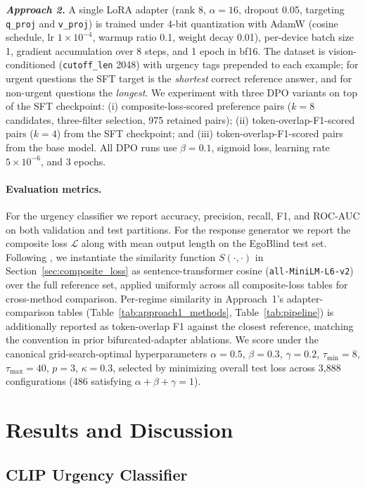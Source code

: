 \documentclass{article}
\begin{document}
\textit{\textbf{Approach 2.}}
A single LoRA adapter (rank 8, $\alpha = 16$, dropout 0.05, targeting \texttt{q\_proj} and \texttt{v\_proj}) is trained under 4-bit quantization with AdamW (cosine schedule, lr $1\!\times\!10^{-4}$, warmup ratio 0.1, weight decay 0.01), per-device batch size 1, gradient accumulation over 8 steps, and 1 epoch in bf16. The dataset is vision-conditioned (\texttt{cutoff\_len} 2048) with urgency tags prepended to each example; for urgent questions the SFT target is the \emph{shortest} correct reference answer, and for non-urgent questions the \emph{longest}. We experiment with three DPO variants on top of the SFT checkpoint: (i) composite-loss-scored preference pairs ($k = 8$ candidates, three-filter selection, 975 retained pairs); (ii) token-overlap-F1-scored pairs ($k = 4$) from the SFT checkpoint; and (iii) token-overlap-F1-scored pairs from the base model. All DPO runs use $\beta = 0.1$, sigmoid loss, learning rate $5 \times 10^{-6}$, and 3 epochs.

\paragraph{Evaluation metrics.}
For the urgency classifier we report accuracy, precision, recall, F1, and ROC-AUC on both validation and test partitions. For the response generator we report the composite loss $\mathcal{L}$ along with mean output length on the EgoBlind test set. Following \cite{xiao2025egoblind}, we instantiate the similarity function $S(\cdot,\cdot)$ in Section~\ref{sec:composite_loss} as sentence-transformer cosine (\texttt{all-MiniLM-L6-v2}) over the full reference set, applied uniformly across all composite-loss tables for cross-method comparison. Per-regime similarity in Approach~1's adapter-comparison tables (Table~\ref{tab:approach1_methods}, Table~\ref{tab:pipeline}) is additionally reported as token-overlap F1 against the closest reference, matching the convention in prior bifurcated-adapter ablations. We score under the canonical grid-search-optimal hyperparameters $\alpha = 0.5$, $\beta = 0.3$, $\gamma = 0.2$, $\tau_{\min} = 8$, $\tau_{\max} = 40$, $p = 3$, $\kappa = 0.3$, selected by minimizing overall test loss across 3{,}888 configurations (486 satisfying $\alpha + \beta + \gamma = 1$).
\section{Results and Discussion}\label{sec:results} 
 
\subsection{CLIP Urgency Classifier}
\label{sec:clip_results}
\end{document}
